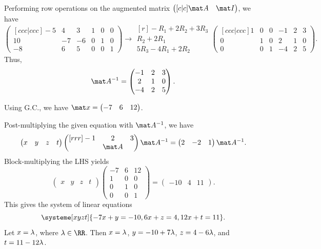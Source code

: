 \begin{solution}
    \begin{ppart}
        Performing row operations on the augmented matrix $\begin{pmatrix}[c|c] \mat A & \mat I\end{pmatrix}$, we have \[\begin{pmatrix}[ccc|ccc]-5 & 4 & 3 & 1 & 0 & 0 \\ 10 & -7 & -6 & 0 & 1 & 0 \\ -8 & 6 & 5 & 0 & 0 & 1\end{pmatrix} \rightarrow \begin{matrix}[r]\scriptstyle -R_1 + 2R_2 + 3R_3 \\ \scriptstyle R_2 + 2R_1 \\ \scriptstyle 5R_3 - 4R_1 + 2R_2\end{matrix} \begin{pmatrix}[ccc|ccc]1 & 0 & 0 & -1 & 2 & 3 \\ 0 & 1 & 0 & 2 & 1 & 0 \\ 0 & 0 & 1 & -4 & 2 & 5\end{pmatrix}.\] Thus, \[\mat A^{-1} = \begin{pmatrix}-1 & 2 & 3 \\ 2 & 1 & 0 \\ -4 & 2 & 5\end{pmatrix}.\]
    \end{ppart}
    \begin{ppart}
        Using G.C., we have $\mat x = \begin{pmatrix}-7 & 6 & 12\end{pmatrix}$.
    \end{ppart}
    \begin{ppart}
        Post-multiplying the given equation with $\mat A^{-1}$, we have \[\begin{pmatrix}x & y & z & t\end{pmatrix} \begin{pmatrix}[rrr]-1 & 2 & 3 \\ & \mat A & \end{pmatrix} \mat A^{-1} = \begin{pmatrix}2 & -2 & 1\end{pmatrix} \mat A^{-1}.\] Block-multiplying the LHS yields \[\begin{pmatrix}x & y & z & t\end{pmatrix}  \begin{pmatrix}-7 & 6 & 12 \\ 1 & 0 & 0 \\ 0 & 1 & 0 \\ 0 & 0 & 1 \end{pmatrix} = \begin{pmatrix}-10 & 4 & 11\end{pmatrix}.\] This gives the system of linear equations \[\systeme[xyzt]{-7x + y = -10, 6x + z = 4, 12x + t = 11}.\] Let $x = \lambda$, where $\l \in \RR$. Then $x = \lambda$, $y = -10 + 7\lambda$, $z = 4 - 6\lambda$, and $t = 11 - 12\lambda$.
    \end{ppart}
\end{solution}